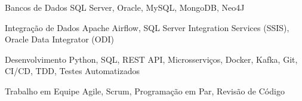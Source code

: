 


\begin{cvskills}


\cvskill
{Bancos de Dados} %
{SQL Server, Oracle, MySQL, MongoDB, Neo4J} %

\cvskill
{Integração de Dados} %
{Apache Airflow, SQL Server Integration Services (SSIS), Oracle Data Integrator (ODI)} %

\cvskill
{Desenvolvimento} %
{Python, SQL, REST API, Microsserviços, Docker, Kafka, Git, CI/CD, TDD, Testes Automatizados} %


\cvskill
{Trabalho em Equipe} %
{Agile, Scrum, Programação em Par, Revisão de Código} %


\end{cvskills}